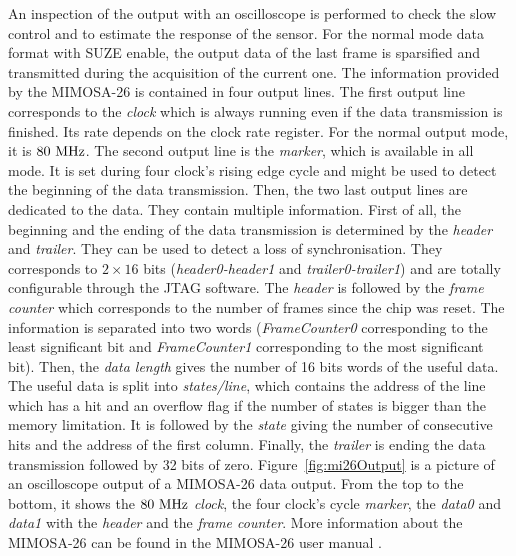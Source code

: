   An inspection of the output with an oscilloscope is performed to check the slow control and to estimate the response of the sensor.
  For the normal mode data format with \gls{SUZE} enable, the output data of the last frame is sparsified and transmitted during the acquisition of the current one.
  The information provided by the \gls{MIMOSA}-26 is contained in four output lines.
  The first output line corresponds to the \textit{clock} which is always running even if the data transmission is finished. 
  Its rate depends on the clock rate register. 
  For the normal output mode, it is $80~\rm{MHz}$.
  The second output line is the \textit{marker}, which is available in all mode.
  It is set during four clock's rising edge cycle and might be used to detect the beginning of the data transmission.
  Then, the two last output lines are dedicated to the data.
  They contain multiple information.
  First of all, the beginning and the ending of the data transmission is determined by the \textit{header} and \textit{trailer}.
  They can be used to detect a loss of synchronisation.
  They corresponds to $2 \times 16$ bits (\textit{header0-header1} and \textit{trailer0-trailer1}) and are totally configurable through the \gls{JTAG} software.
  The \textit{header} is followed by the \textit{frame counter} which corresponds to the number of frames since the chip was reset. 
  The information is separated into two words (\textit{FrameCounter0} corresponding to the least significant bit and \textit{FrameCounter1} corresponding to the most significant bit).
  Then, the \textit{data length} gives the number of 16 bits words of the useful data. 
  The useful data is split into \textit{states/line}, which contains the address of the line which has a hit and an overflow flag if the number of states is bigger than the memory limitation.
  It is followed by the \textit{state} giving the number of consecutive hits and the address of the first column.
  Finally, the \textit{trailer} is ending the data transmission followed by 32 bits of zero.
  Figure~\ref{fig:mi26Output} is a picture of an oscilloscope output of a \gls{MIMOSA}-26 data output. From the top to the bottom, it shows the $80~\rm{MHz}$ \textit{clock}, the four clock's cycle \textit{marker}, the \textit{data0} and \textit{data1} with the \textit{header} and the \textit{frame counter}.
  More information about the \gls{MIMOSA}-26 can be found in the \gls{MIMOSA}-26 user manual \cite{manualMi26}.

